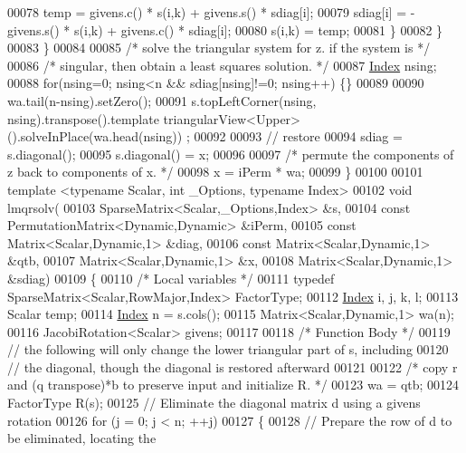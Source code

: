 \begin{DoxyCode}
00078                 temp = givens.c() * s(i,k) + givens.s() * sdiag[i];
00079                 sdiag[i] = -givens.s() * s(i,k) + givens.c() * sdiag[i];
00080                 s(i,k) = temp;
00081             \}
00082         \}
00083     \}
00084   
00085     \textcolor{comment}{/*     solve the triangular system for z. if the system is */}
00086     \textcolor{comment}{/*     singular, then obtain a least squares solution. */}
00087     \hyperlink{namespace_eigen_a62e77e0933482dafde8fe197d9a2cfde}{Index} nsing;
00088     \textcolor{keywordflow}{for}(nsing=0; nsing<n && sdiag[nsing]!=0; nsing++) \{\}
00089 
00090     wa.tail(n-nsing).setZero();
00091     s.topLeftCorner(nsing, nsing).transpose().template triangularView<Upper>().solveInPlace(wa.head(nsing))
      ;
00092   
00093     \textcolor{comment}{// restore}
00094     sdiag = s.diagonal();
00095     s.diagonal() = x;
00096 
00097     \textcolor{comment}{/* permute the components of z back to components of x. */}
00098     x = iPerm * wa; 
00099 \}
00100 
00101 \textcolor{keyword}{template} <\textcolor{keyword}{typename} Scalar, \textcolor{keywordtype}{int} \_Options, \textcolor{keyword}{typename} Index>
00102 \textcolor{keywordtype}{void} lmqrsolv(
00103   SparseMatrix<Scalar,\_Options,Index> &s,
00104   \textcolor{keyword}{const} PermutationMatrix<Dynamic,Dynamic> &iPerm,
00105   \textcolor{keyword}{const} Matrix<Scalar,Dynamic,1> &diag,
00106   \textcolor{keyword}{const} Matrix<Scalar,Dynamic,1> &qtb,
00107   Matrix<Scalar,Dynamic,1> &x,
00108   Matrix<Scalar,Dynamic,1> &sdiag)
00109 \{
00110   \textcolor{comment}{/* Local variables */}
00111   \textcolor{keyword}{typedef} SparseMatrix<Scalar,RowMajor,Index> FactorType;
00112     \hyperlink{namespace_eigen_a62e77e0933482dafde8fe197d9a2cfde}{Index} i, j, k, l;
00113     Scalar temp;
00114     \hyperlink{namespace_eigen_a62e77e0933482dafde8fe197d9a2cfde}{Index} n = s.cols();
00115     Matrix<Scalar,Dynamic,1>  wa(n);
00116     JacobiRotation<Scalar> givens;
00117 
00118     \textcolor{comment}{/* Function Body */}
00119     \textcolor{comment}{// the following will only change the lower triangular part of s, including}
00120     \textcolor{comment}{// the diagonal, though the diagonal is restored afterward}
00121 
00122     \textcolor{comment}{/*     copy r and (q transpose)*b to preserve input and initialize R. */}
00123     wa = qtb;
00124     FactorType R(s);
00125     \textcolor{comment}{// Eliminate the diagonal matrix d using a givens rotation}
00126     \textcolor{keywordflow}{for} (j = 0; j < n; ++j)
00127     \{
00128       \textcolor{comment}{// Prepare the row of d to be eliminated, locating the }

\end{DoxyCode}
